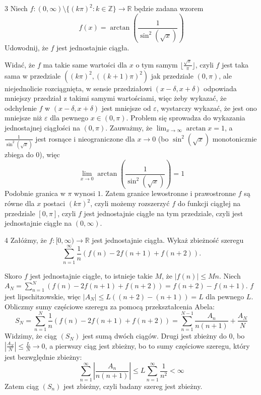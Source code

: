 \documentclass{../note}
\begin{document}
\begin{zadanie}{3}
Niech $f:(0,\infty)\setminus\{(k\pi)^{2}:k\in\mathbb{Z}\}\rightarrow\mathbb{R}$ będzie zadana wzorem
$$ f(x)=\arctan\left(\frac{1}{\sin^{2}(\sqrt{x})}\right) $$
Udowodnij, że $f$ jest jednostajnie ciągła.
\end{zadanie}
\begin{rozwiazanie}
Widać, że $f$ ma takie same wartości dla $x$ o tym samym $\lfloor\frac{\sqrt{x}}{\pi}\rfloor$, czyli $f$ jest taka sama w przedziale $((k\pi)^2, ((k+1)\pi)^2)$ jak przedziale $(0, \pi)$, ale niejednolicie rozciągnięta, w sensie przedziałowi $(x - \delta, x + \delta)$ odpowiada mniejszy przedział z takimi samymi wartościami, więc żeby wykazać, że odchylenie $f$ w $(x - \delta, x + \delta)$ jest mniejsze od $\varepsilon$, wystarczy wykazać, że jest ono mniejsze niż $\varepsilon$ dla pewnego $x \in (0, \pi)$. Problem się sprowadza do wykazania jednostajnej ciągłości na $(0, \pi)$. Zauważmy, że $\lim_{x\to\infty} \arctan x = 1$, a $\frac{1}{\sin^{2}(\sqrt{x})}$ jest rosnące i nieograniczone dla $x \to 0$ (bo $\sin^{2}(\sqrt{x})$ monotonicznie zbiega do 0), więc
\[\lim_{x\to0} \arctan\left(\frac{1}{\sin^{2}(\sqrt{x})}\right) = 1\]
Podobnie granica w $\pi$ wynosi $1$. Zatem granice lewostronne i prawostronne $f$ są równe dla $x$ postaci $(k\pi)^2$, czyli możemy rozszerzyć $f$ do funkcji ciągłej na przedziale $[0, \pi]$, czyli $f$ jest jednostajnie ciągłe na tym przedziale, czyli jest jednostajnie ciągłe na $(0, \infty)$.
\end{rozwiazanie}

\begin{zadanie}{4}
Załóżmy, że $f:[0,\infty)\rightarrow\mathbb{R}$ jest jednostajnie ciągła. Wykaż zbieżność szeregu
$$ \sum_{n=1}^{\infty}\frac{1}{n}(f(n)-2f(n+1)+f(n+2)). $$
\end{zadanie}
\begin{rozwiazanie}
Skoro $f$ jest jednostajnie ciągłe, to istnieje takie $M$, że $|f(n)| \leq Mn$. Niech $A_N = \sum_{n=1}^{N}(f(n)-2f(n+1)+f(n+2)) = f(n+2) - f(n+1)$. $f$ jest lipschitzowskie, więc $|A_N| \leq L((n+2) - (n+1)) = L$ dla pewnego $L$. Obliczmy sumy częściowe szeregu za pomocą przekształcenia Abela:
\[S_N = \sum_{n=1}^{N}\frac{1}{n}(f(n)-2f(n+1)+f(n+2)) = \sum_{n=1}^{N-1}\frac{A_n}{n(n+1)} + \frac{A_N}{N}\]
Widzimy, że ciąg $(S_N)$ jest sumą dwóch ciągów. Drugi jest zbieżny do 0, bo $|\frac{A_N}{N}| \leq \frac{L}{N} \to 0$, a pierwszy ciąg jest zbieżny, bo to sumy częściowe szeregu, który jest bezwględnie zbieżny:
\[\sum_{n=1}^{\infty}\left|\frac{A_n}{n(n+1)}\right| \leq L\sum_{n=1}^{\infty}\frac{1}{n^2} < \infty\]
Zatem ciąg $(S_n)$ jest zbieżny, czyli badany szereg jest zbieżny.
\end{rozwiazanie}
\end{document}
